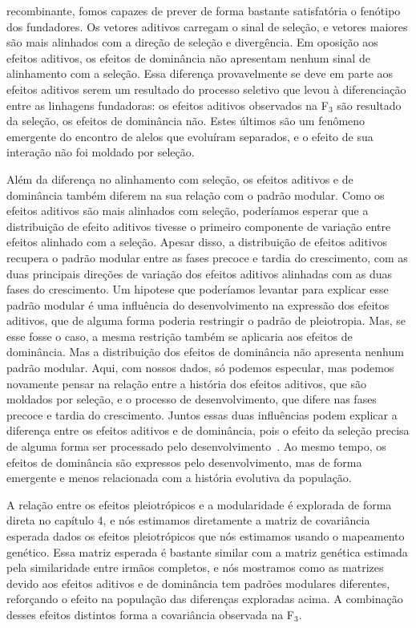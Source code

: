 \begin{refsection}
recombinante, fomos capazes de prever de forma bastante satisfatória o
fenótipo dos fundadores. Os vetores aditivos carregam o sinal de seleção, e
vetores maiores são mais alinhados com a direção de seleção e divergência.  Em
oposição aos efeitos aditivos, os efeitos de dominância não apresentam nenhum
sinal de alinhamento com a seleção. Essa diferença provavelmente se deve em
parte aos efeitos aditivos serem um resultado do processo seletivo que levou à
diferenciação entre as linhagens fundadoras: os efeitos aditivos observados na
F$_3$ são resultado da seleção, os efeitos de dominância não. Estes últimos
são um fenômeno emergente do encontro de alelos que evoluíram separados, e o
efeito de sua interação não foi moldado por seleção.

Além da diferença no alinhamento com seleção, os efeitos aditivos e de
dominância também diferem na sua relação com o padrão modular. Como os efeitos
aditivos são mais alinhados com seleção, poderíamos esperar que a distribuição
de efeito aditivos tivesse o primeiro componente de variação entre efeitos
alinhado com a seleção. Apesar disso, a distribuição de efeitos aditivos
recupera o padrão modular entre as fases precoce e tardia do crescimento, com
as duas principais direções de variação dos efeitos aditivos alinhadas com as
duas fases do crescimento. Um hipotese que poderíamos levantar para explicar
esse padrão modular é uma influência do desenvolvimento na expressão dos
efeitos aditivos, que de alguma forma poderia restringir o padrão de
pleiotropia. Mas, se esse fosse o caso, a mesma restrição também se aplicaria
aos efeitos de dominância. Mas a distribuição dos efeitos de dominância não
apresenta nenhum padrão modular. Aqui, com nossos dados, só podemos especular,
mas podemos novamente pensar na relação entre a história dos efeitos aditivos,
que são moldados por seleção, e o processo de desenvolvimento, que difere nas
fases precoce e tardia do crescimento. Juntos essas duas influências podem
explicar a diferença entre os efeitos aditivos e de dominância, pois o efeito
da seleção precisa de alguma forma ser processado pelo
desenvolvimento~\parencite{Klingenberg2008-ll}. Ao mesmo tempo, os efeitos de
dominância são expressos pelo desenvolvimento, mas de forma emergente e menos
relacionada com a história evolutiva da população.

A relação entre os efeitos pleiotrópicos e a modularidade é explorada de forma
direta no capítulo 4, e nós estimamos diretamente a matriz de covariância
esperada dados os efeitos pleiotrópicos que nós estimamos usando o mapeamento
genético. Essa matriz esperada é bastante similar com a matriz genética
estimada pela similaridade entre irmãos completos, e nós mostramos como as
matrizes devido aos efeitos aditivos e de dominância tem padrões modulares
diferentes, reforçando o efeito na população das diferenças exploradas acima.
A combinação desses efeitos distintos forma a covariância observada na F$_3$.


\end{refsection}
